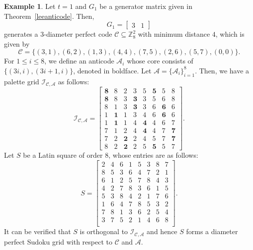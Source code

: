 \documentclass{article}
\theoremstyle{definition}
\newtheorem{example}{Example}[section]
\begin{document}
\begin{example}
    Let $t=1$ and $G_1$ be a generator matrix given in Theorem~\ref{leeanticode}. Then,
    \[
    G_1=\begin{bmatrix}
        3 & 1
    \end{bmatrix}
    \]
    generates a $3$-diameter perfect code $\mathcal{C}\subseteq\mathbb{Z}_8^2$ with minimum distance $4$, which is given by
    \[
    \mathcal{C}=\{(3, 1), (6, 2), (1, 3), (4, 4), (7, 5), (2, 6), (5, 7), (0, 0)\}.
    \]
    For $1\le i\le 8$, we define an anticode $\mathcal{A}_i$ whose core consists of $\{(3i, i), (3i+1, i)\}$, denoted in boldface. Let $\mathcal{A}=\{\mathcal{A}_i\}_{i=1}^8$. Then, we have a palette grid $\mathcal{I}_{\mathcal{C}, \mathcal{A}}$ as follows:
\[\mathcal{I}_{\mathcal{C}, \mathcal{A}}=
\begin{bmatrix}
    \mathbf{8} & 8 & 2 & 3 & 5 & \mathbf{5} & 5 & 8\\\mathbf{8} & 8 & 3 & \mathbf{3} & 3 & 5 & 6 & 8\\8 & 1 & 3 & \mathbf{3} & 3 & 6 & \mathbf{6} & 6\\1 & \mathbf{1} & 1 & 3 & 4 & 6 & \mathbf{6} & 6\\1 & \mathbf{1} & 1 & 4 & \mathbf{4} & 4 & 6 & 7\\7 & 1 & 2 & 4 & \mathbf{4} & 4 & 7& \mathbf{7}\\7 & 2 & \mathbf{2} & 2 & 4 & 5 & 7 & \mathbf{7}\\8 & 2 & \mathbf{2} & 2 & 5 & \mathbf{5} & 5 & 7
\end{bmatrix}.
\]
Let $S$ be a Latin square of order $8$, whose entries are as follows:
\[
S=\begin{bmatrix}
    2 & 4 & 6 & 1 & 5 & 3 & 8 & 7\\
    8 & 5 & 3 & 6 & 4 & 7 & 2 & 1\\
    6 & 1 & 2 & 5 & 7 & 8 & 4 & 3\\
    4 & 2 & 7 & 8 & 3 & 6 & 1 & 5\\
    5 & 3 & 8 & 4 & 2 & 1 & 7 & 6\\
    1 & 6 & 4 & 7 & 8 & 5 & 3 & 2\\
    7 & 8 & 1 & 3 & 6 & 2 & 5 & 4\\
    3 & 7 & 5 & 2 & 1 & 4 & 6 & 8\\
\end{bmatrix}.
\]
It can be verified that $S$ is orthogonal to $\mathcal{I}_{\mathcal{C}, \mathcal{A}}$ and hence $S$ forms a diameter perfect Sudoku grid with respect to $\mathcal{C}$ and $\mathcal{A}$.
\end{example}
\end{document}
